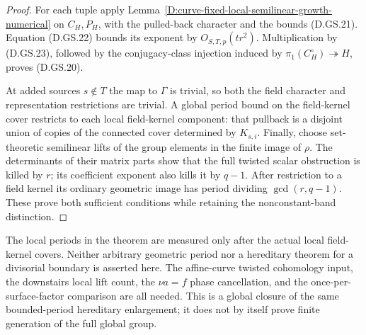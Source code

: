 \begin{proof}
For each tuple apply
Lemma~\ref{D:curve-fixed-local-semilinear-growth-numerical}
on \(C_H,P_H\), with the pulled-back character
and the bounds (D.GS.21).
Equation (D.GS.22) bounds its exponent by
\(O_{S,T,p}(t r^2)\).
Multiplication by (D.GS.23), followed by the
conjugacy-class injection induced by
\(\pi_1(C_H^\circ)\twoheadrightarrow H\),
proves (D.GS.20).

At added sources \(s\notin T\) the map to
\(\Gamma\) is trivial, so both the field
character and representation restrictions
are trivial. A global period bound on the
field-kernel cover restricts to each local
field-kernel component: that pullback is a
disjoint union of copies of the connected
cover determined by \(K_{s,i}\).
Finally, choose set-theoretic semilinear lifts
of the group elements in the finite image of \(\rho\).
The determinants of their matrix parts show
that the full twisted scalar obstruction is
killed by \(r\); its coefficient exponent
also kills it by \(q-1\).
After restriction to a field kernel its
ordinary geometric image has period dividing
\(\gcd(r,q-1)\).
These prove both sufficient conditions while
retaining the nonconstant-band distinction.
\end{proof}

\begin{remark}
The local periods in the theorem are measured
only after the actual local field-kernel covers.
Neither arbitrary geometric period nor a
hereditary theorem for a divisorial boundary
is asserted here. The affine-curve twisted
cohomology input, the downstairs local lift
count, the \(\nu a=f\) phase cancellation,
and the once-per-surface-factor comparison
are all needed. This is a global closure of
the same bounded-period hereditary enlargement;
it does not by itself prove finite generation
of the full global group.
\end{remark}
